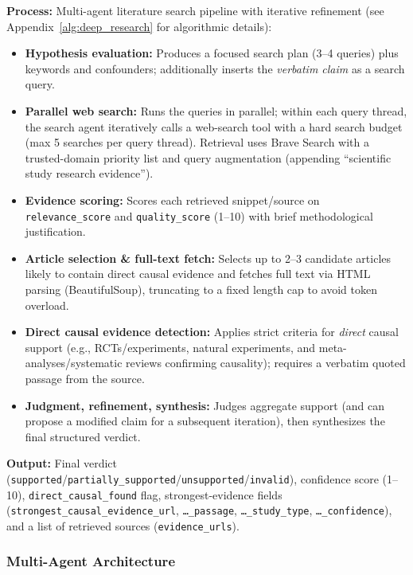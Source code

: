\textbf{Process:} Multi-agent literature search pipeline with iterative refinement (see Appendix~\ref{alg:deep_research} for algorithmic details):
\begin{itemize}[noitemsep]
    \item \textbf{Hypothesis evaluation:} Produces a focused search plan (3--4 queries) plus keywords and confounders; additionally inserts the \emph{verbatim claim} as a search query.
    \item \textbf{Parallel web search:} Runs the queries in parallel; within each query thread, the search agent iteratively calls a web-search tool with a hard search budget (max 5 searches per query thread). Retrieval uses Brave Search with a trusted-domain priority list and query augmentation (appending ``scientific study research evidence'').
    \item \textbf{Evidence scoring:} Scores each retrieved snippet/source on \texttt{relevance\_score} and \texttt{quality\_score} (1--10) with brief methodological justification.
    \item \textbf{Article selection \& full-text fetch:} Selects up to 2--3 candidate articles likely to contain direct causal evidence and fetches full text via HTML parsing (BeautifulSoup), truncating to a fixed length cap to avoid token overload.
    \item \textbf{Direct causal evidence detection:} Applies strict criteria for \emph{direct} causal support (e.g., RCTs/experiments, natural experiments, and meta-analyses/systematic reviews confirming causality); requires a verbatim quoted passage from the source.
    \item \textbf{Judgment, refinement, synthesis:} Judges aggregate support (and can propose a modified claim for a subsequent iteration), then synthesizes the final structured verdict.
\end{itemize}

\textbf{Output:} Final verdict (\texttt{supported}/\texttt{partially\_supported}/\texttt{unsupported}/\texttt{invalid}), confidence score (1--10), \texttt{direct\_causal\_found} flag, strongest-evidence fields (\texttt{strongest\_causal\_evidence\_url}, \texttt{\dots\_passage}, \texttt{\dots\_study\_type}, \texttt{\dots\_confidence}), and a list of retrieved sources (\texttt{evidence\_urls}).

\subsubsection{Multi-Agent Architecture}

